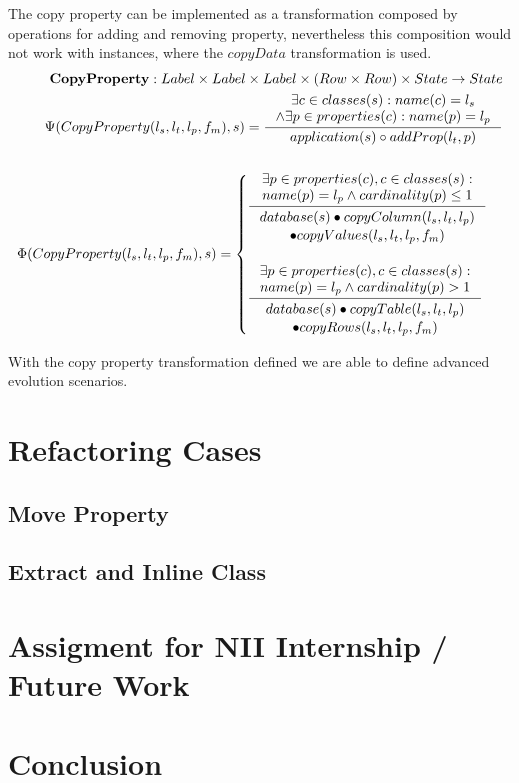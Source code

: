 \documentclass[11pt]{article}
\begin{document}
The copy property can be implemented as a transformation composed by operations for adding and removing property, nevertheless this composition would not work with instances, where the $copyData$ transformation is used.
\begin{align*}
	\mathbf{CopyProperty} : Label \times Label \times Label \times (Row \times Row) \times State \rightarrow State \\
	\Psi(CopyProperty(l_s, l_t, l_p, f_m), s) = \inference{\exists c \in classes(s) : name(c) = l_s \\ \wedge \exists p \in properties(c) : name(p) = l_p }{application(s) \circ addProp(l_t, p)} \\\\
	\Phi(CopyProperty(l_s, l_t, l_p, f_m), s) = \begin{cases}
		\inference{\exists p \in properties(c), c \in classes(s) : \\ name(p) = l_p \wedge cardinality(p) \leq 1 }{\begin{gathered}
			database(s) \bullet copyColumn(l_s, l_t, l_p) \\ \bullet copyValues(l_s, l_t, l_p, f_m) 
			\end{gathered}} \\ \\
		\inference{\exists p \in properties(c), c \in classes(s) : \\ name(p) = l_p \wedge cardinality(p) > 1}{\begin{gathered}
			database(s) \bullet copyTable(l_s, l_t, l_p) \\ \bullet copyRows(l_s, l_t, l_p, f_m) 
			\end{gathered}}
 \end{cases}
\end{align*}

With the copy property transformation defined we are able to define advanced evolution scenarios.


\section{Refactoring Cases}
\subsection{Move Property}
\subsection{Extract and Inline Class}

\section{Assigment for NII Internship / Future Work}
\section{Conclusion}
\end{document}
